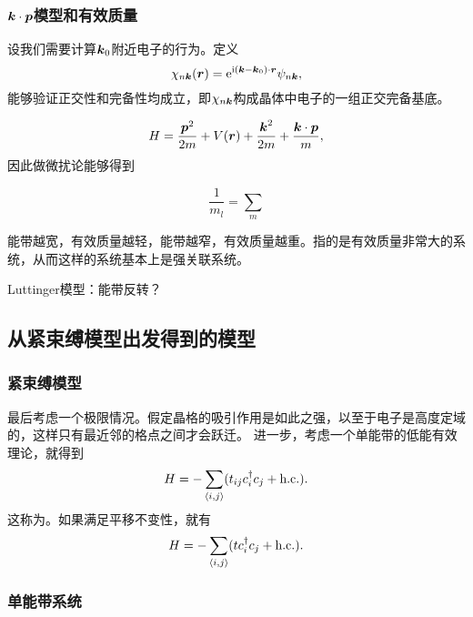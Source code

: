 \subsubsection{$\vb*{k} \cdot \vb*{p}$模型和有效质量}

设我们需要计算$\vb*{k}_0$附近电子的行为。定义
\begin{equation}
    \chi_{n \vb*{k}}(\vb*{r}) = \mathrm{e}^{\mathrm{i} (\vb*{k} - \vb*{k}_0) \cdot \vb*{r}} \psi_{n \vb*{k}} ,
\end{equation}
能够验证正交性和完备性均成立，即$\chi_{n \vb*{k}}$构成晶体中电子的一组正交完备基底。

\begin{equation}
    H = \frac{\vb*{p}^2}{2m} + V(\vb*{r}) + \frac{\vb*{k}^2}{2m} + \frac{\vb*{k} \cdot \vb*{p}}{m},
\end{equation}
因此做微扰论能够得到

\begin{equation}
    \frac{1}{m_l} = \sum_m 
\end{equation}

能带越宽，有效质量越轻，能带越窄，有效质量越重。指的是有效质量非常大的系统，从而这样的系统基本上是强关联系统。

Luttinger模型：能带反转？

\subsection{从紧束缚模型出发得到的模型}

\subsubsection{紧束缚模型}

最后考虑一个极限情况。假定晶格的吸引作用是如此之强，以至于电子是高度定域的，这样只有最近邻的格点之间才会跃迁。
进一步，考虑一个单能带的低能有效理论，就得到
\begin{equation}
    {H} = - \sum_{\langle i, j \rangle} (t_{ij} {c}^\dagger_i {c}_j + \text{h.c.}).
\end{equation}
这称为。如果满足平移不变性，就有
\begin{equation}
    {H} = - \sum_{\langle i, j \rangle} (t {c}^\dagger_i {c}_j + \text{h.c.}).
\end{equation}

\subsubsection{单能带系统}

